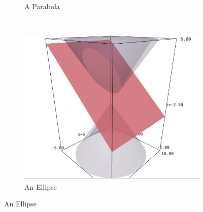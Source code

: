 \documentclass{article}
\theoremstyle{definition}
\begin{document}
\begin{figure}[H]
\begin{subfigure}[b]{0.3\textwidth}
\caption{A Parabola}
\label{fig:tiger}
\end{subfigure}
~ %
\begin{subfigure}[b]{0.3\textwidth}
\includegraphics[width=\textwidth]{Selection_052}
\caption{An Ellipse}
\label{fig:mouse}
\end{subfigure}


\end{figure}
\end{document}
